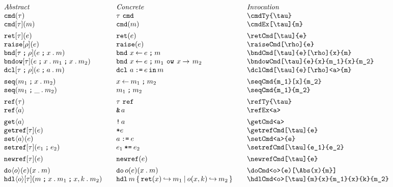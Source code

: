 \documentclass[11pt]{article}
\begin{document}
\begin{figure}

  \begin{small}
    \begin{displaymath}
      \begin{array}{l@{\qquad}l@{\qquad}l@{\qquad}l}
        \textit{Abstract} & \textit{Concrete} & \textit{Invocation} \\
        \cmdTy{\tau}               & \cmdTy*{\tau}               & \verb|\cmdTy{\tau}|               \\
        \cmdEx[\tau]{m}            & \cmdEx*{m}                  & \verb|\cmdEx[\tau]{m}|            \\[1ex]
        \retCmd[\tau]{e}           & \retCmd*{e}                 & \verb|\retCmd[\tau]{e}|           \\
        \raiseCmd[\rho]{e}         & \raiseCmd*{e}               & \verb|\raiseCmd[\rho]{e}| \\
        \bndCmd[\tau]{e}[\rho]{x}{m}           & \bndCmd*{e}{x}{m}           & \verb|\bndCmd[\tau]{e}[\rho]{x}{m}|           \\
        \bndowCmd[\tau]{e}{x}{m_1}{x}{m_2}     & \bndowCmd*{e}{x}{m_1}{x}{m_2}  & \verb|\bndowCmd[\tau]{e}{x}{m_1}{x}{m_2}| \\
        \dclCmd[\tau]{e}[\rho]<a>{m}           & \dclCmd*{e}<a>{m}           & \verb|\dclCmd[\tau]{e}[\rho]<a>{m}|           \\[1ex]
        \seqCmd{m_1}[x]{m_2}       & \seqCmd*{m_1}[x]{m_2}          & \verb|\seqCmd{m_1}[x]{m_2}| \\
        \seqCmd{m_1}{m_2}          & \seqCmd*{m_1}{m_2}          & \verb|\seqCmd{m_1}{m_2}| \\[1ex]
        \refTy{\tau}               & \refTy*{\tau}               & \verb|\refTy{\tau}| \\
        \refEx<a>                  & \refEx*<a>                 & \verb|\refEx<a>|                  \\[1ex]
        \getCmd<a>                 & \getCmd*<a>                 & \verb|\getCmd<a>|                 \\
        \getrefCmd[\tau]{e}        & \getrefCmd*{e}              & \verb|\getrefCmd[\tau]{e}|        \\
        \setCmd<a>{e}              & \setCmd*<a>{e}              & \verb|\setCmd<a>{e}|              \\
        \setrefCmd[\tau]{e_1}{e_2} & \setrefCmd*[\tau]{e_1}{e_2} & \verb|\setrefCmd[\tau]{e_1}{e_2}|  \\[1ex]
        \newrefCmd[\tau]{e}        & \newrefCmd*{e}              & \verb|\newrefCmd[\tau]{e}| \\[1ex]
        \doCmd<o>(e)[\Abs(x){m}]            & \doCmd*<o>(e)[\Abs(x){m}]            & \verb|\doCmd<o>(e)[\Abs(x){m}]| \\
        \hdlCmd<o>[\tau]{m}{x}{m_1}{x}{k}{m_2} & \hdlCmd*<o>{m}{x}{m_1}{x}{k}{m_2}  & \verb|\hdlCmd<o>[\tau]{m}{x}{m_1}{x}{k}{m_2}| 
      \end{array}
    \end{displaymath}
  \end{small}


\end{figure}
\end{document}
